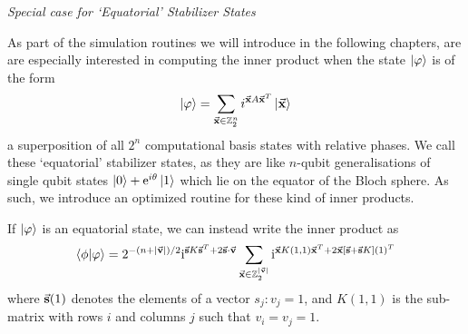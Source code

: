 \large{\itshape{Special case for `Equatorial' Stabilizer States}}\par
As part of the simulation routines we will introduce in the following chapters, are are especially interested in computing the inner product when the state $\ket{\varphi}$ is of the form
\[\ket{\varphi} = \sum_{\va{x}\in\mathbb{Z}_{2}^{n}}i^{\va{x}A\va{x}^{T}}\ket{\va{x}}\]
a superposition of all $2^{n}$ computational basis states with relative phases. We call these `equatorial' stabilizer states, as they are like $n$-qubit generalisations of single qubit states $\ket{0}+\mathrm{e}^{i\theta}\ket{1}$ which lie on the equator of the Bloch sphere. As such, we introduce an optimized routine for these kind of inner products.
\begin{cla}
If $\ket{\varphi}$ is an equatorial state, we can instead write the inner product as
\begin{equation}
\braket{\phi}{\varphi} = 2^{-(n+\vert \va{v}\vert)/2}\mathrm{i}^{\va{s}K\va{s}^{T}+2\va{s}\cdot \va{v}}\sum_{\va{x}\in\mathbb{Z}_{2}^{\vert \va{v}\vert}}\mathrm{i}^{\va{x}K(1,1)\va{x}^{T}+2\va{x}[\va{s}+\va{s}K](1)^{T}}
\end{equation}\label{claim:exp_sum_ip}
where $\va{s}(1)$ denotes the elements of a vector $s_{j}: v_{j}=1$, and $K(1,1)$ is the sub-matrix with rows $i$ and columns $j$ such that $v_{i}=v_{j}=1$. 
\end{cla}
